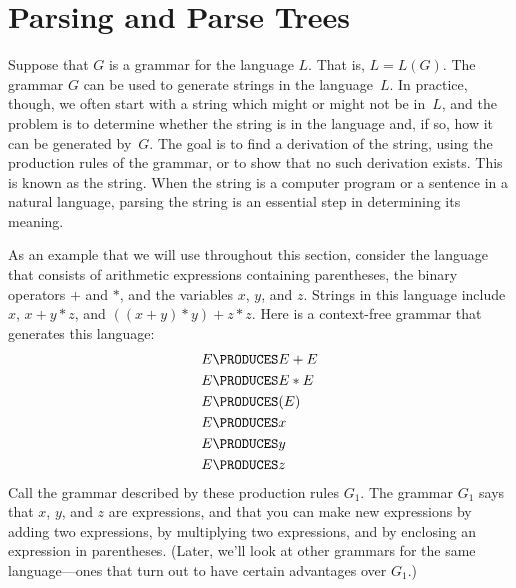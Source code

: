 \section{Parsing and Parse Trees}\label{S-grammars-3}

Suppose that $G$ is a grammar for the language $L$.  That is, 
$L=L(G)$.  The grammar $G$ can be used to generate strings in
the language~$L$.  In practice, though, we often start with a string
which might or might not be in~$L$, and the problem is
to determine whether the string is in the language and, if so,
how it can be generated by~$G$.  The goal is to find a derivation
of the string, using the production rules of the grammar, or to
show that no such derivation exists.  This is known as 
the string.  When the string is a computer program or a sentence
in a natural language, parsing the string is an essential step
in determining its meaning.

As an example that we will use throughout
this section, consider the language that consists of arithmetic
expressions containing parentheses, the binary operators $+$ and $*$,
and the variables $x$, $y$, and $z$.  Strings in this language
include $x$, $x+y*z$, and $((x+y)*y)+z*z$.  Here is a context-free
grammar that generates this language:
\begin{align*}
   E&\PRODUCES E+E\\
   E&\PRODUCES E*E\\
   E&\PRODUCES (E)\\
   E&\PRODUCES x\\
   E&\PRODUCES y\\
   E&\PRODUCES z
\end{align*}
Call the grammar described by these production rules $G_1$.
The grammar $G_1$ says that $x$, $y$, and $z$ are expressions, and that
you can make new expressions by adding two expressions, by multiplying
two expressions, and by enclosing an expression in parentheses.
(Later, we'll look at other grammars for the same language---ones that
turn out to have certain advantages over $G_1$.)

